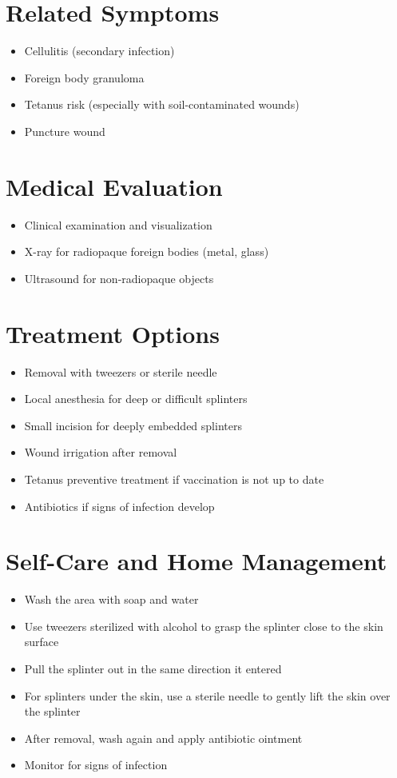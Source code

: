 \section*{Related Symptoms}
\begin{itemize}
\item Cellulitis (secondary infection)
\item Foreign body granuloma
\item Tetanus risk (especially with soil-contaminated wounds)
\item Puncture wound
\end{itemize}

\section*{Medical Evaluation}
\begin{itemize}
\item Clinical examination and visualization
\item X-ray for radiopaque foreign bodies (metal, glass)
\item Ultrasound for non-radiopaque objects
\end{itemize}

\section*{Treatment Options}
\begin{itemize}
\item Removal with tweezers or sterile needle
\item Local anesthesia for deep or difficult splinters
\item Small incision for deeply embedded splinters
\item Wound irrigation after removal
\item Tetanus preventive treatment if vaccination is not up to date
\item Antibiotics if signs of infection develop
\end{itemize}

\section*{Self-Care and Home Management}
\begin{itemize}
\item Wash the area with soap and water
\item Use tweezers sterilized with alcohol to grasp the splinter close to the skin surface
\item Pull the splinter out in the same direction it entered
\item For splinters under the skin, use a sterile needle to gently lift the skin over the splinter
\item After removal, wash again and apply antibiotic ointment
\item Monitor for signs of infection
\end{itemize}

